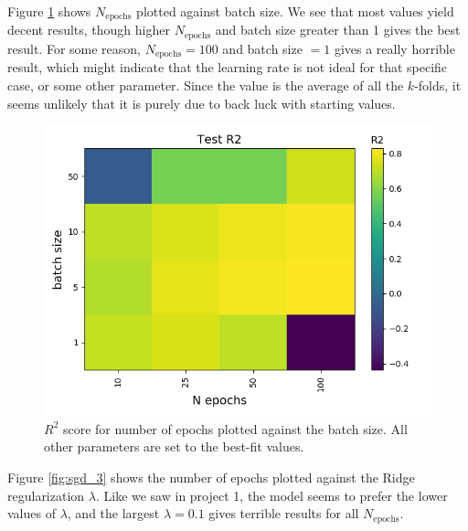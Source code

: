 \documentclass[a4paper]{article}
\newcommand{\Nepochs}{N_{\text{epochs}}}
\begin{document}
Figure \ref{fig:sgd_2} shows $\Nepochs$ plotted against batch size. We see that most values yield decent results, though higher $\Nepochs$ and batch size greater than 1 gives the best result. For some reason, $\Nepochs=100$ and batch size $=1$ gives a really horrible result, which might indicate that the learning rate is not ideal for that specific case, or some other parameter. Since the value is the average of all the $k$-folds, it seems unlikely that it is purely due to back luck with starting values.
\begin{figure}[H]
	\centering
	\includegraphics[scale=0.5]{../figures/task_a/test_p8/heatmap_test_p8_lr_constant_Nhyp4434_R2_n_epochs_bsize.png}
	\caption{$R^2$ score for number of epochs plotted against the batch size. All other parameters are set to the best-fit values.}
	\label{fig:sgd_2}
\end{figure}
Figure \ref{fig:sgd_3} shows the number of epochs plotted against the Ridge regularization $\lambda$. Like we saw in project 1, the model seems to prefer the lower values of $\lambda$, and the largest $\lambda = 0.1$ gives terrible results for all $\Nepochs$.
\end{document}
